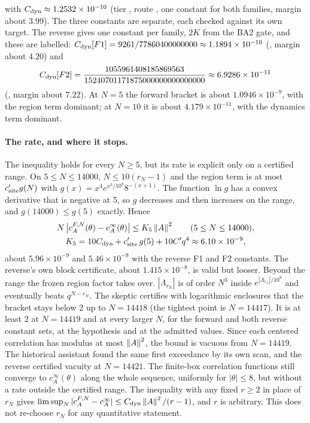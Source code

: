 with $C_{\rm dyn}\approx1.2532\times10^{-10}$ (tier
, route , one constant
for both families, margin about $3.99$). The three constants are separate,
each checked against its own target. The reverse gives one constant per
family, $2K$ from the BA2 gate, and these are labelled:
$C_{\rm dyn}[F1]=9261/77860400000000\approx1.1894\times10^{-10}$
(, margin about $4.20$) and
\[
 C_{\rm dyn}[F2]=\frac{1055961408185869563}{15240701171875000000000000000}\approx6.9286\times10^{-11}
\]
(, margin about $7.22$). At $N=5$ the forward bracket
is about $1.0946\times10^{-9}$, with the region term dominant; at $N=10$ it is
about $4.179\times10^{-11}$, with the dynamics term dominant.

\paragraph{The rate, and where it stops.} The inequality holds for every
$N\ge5$, but its rate is explicit only on a certified range. On
$5\le N\le14000$, $N\le10(r_N-1)$ and the region term is at most
$c'_{\rm site}g(N)$ with $g(x)=x^4e^{x^3/10^8}8^{-(x+1)}$. The function $\ln g$
has a convex derivative that is negative at 5, so $g$ decreases and then
increases on the range, and $g(14000)\le g(5)$ exactly. Hence
\begin{equation}
 \begin{gathered}
 N\,\bigl|c^{F,N}_A(\theta)-c^\infty_A(\theta)\bigr|\le K_5\left\lVert A\right\rVert^2\qquad(5\le N\le14000),\\
 K_5=10C_{\rm dyn}+c'_{\rm site}\,g(5)+10C'q^4\approx6.10\times10^{-9},
 \end{gathered}
 \label{eq:bb2-K5}
\end{equation}
about $5.96\times10^{-9}$ and $5.46\times10^{-9}$ with the reverse F1 and F2
constants. The reverse's own block certificate, about $1.415\times10^{-8}$,
is valid but looser. Beyond the range the frozen region factor takes over.
$|\Lambda_{r_N}|$ is of order $N^3$ inside $e^{|\Lambda_{r_N}|/10^8}$ and
eventually beats $q^{N-r_N}$. The skeptic certifies with logarithmic
enclosures that the bracket stays below 2 up to $N=14418$ (the tightest point
is $N=14417$). It is at least 2 at $N=14419$ and at every larger $N$, for the
forward and both reverse constant sets, at the hypothesis and at the admitted
values. Since each centered correlation has modulus at most $\left\lVert A\right\rVert^2$, the
bound is vacuous from $N=14419$. The historical assistant found the same
first exceedance by its own scan, and the reverse certified vacuity at
$N=14421$. The finite-box correlation functions still converge to
$c^\infty_A(\theta)$ along the whole sequence, uniformly for $|\theta|\le8$,
but without a rate outside the certified range. The inequality with any fixed
$r\ge2$ in place of $r_N$ gives
$\limsup_N|c^{F,N}_A-c^\infty_A|\le C_{\rm dyn}\left\lVert A\right\rVert^2/(r-1)$, and $r$ is
arbitrary. This does not re-choose $r_N$ for any quantitative statement.


